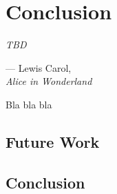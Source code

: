 \let\textcircled=\pgftextcircled
\chapter*{Conclusion}
\label{chap:discussion}

\epigraph{\hspace{4ex}\textit{TBD}}{--- Lewis Carol,\\ \textit{Alice in Wonderland}}

Bla bla bla

\section*{Future Work}
\label{future-work}

\section*{Conclusion}
